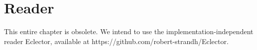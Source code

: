 \chapter{Reader}

This entire chapter is obsolete.  We intend to use the
implementation-independent reader Eclector, available at
https://github.com/robert-strandh/Eclector.
